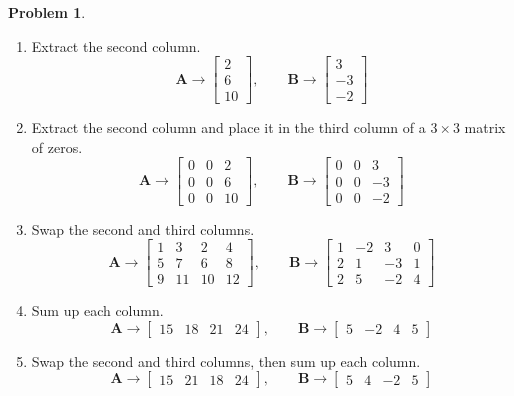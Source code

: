 \documentclass[12pt]{article}
\theoremstyle{definition}
\newtheorem{problem}{Problem}
\renewcommand{\vec}{\mathbf}
\begin{document}
\begin{problem}
    \begin{enumerate}
        \item Extract the second column.
            \[
                \vec{A} \to \begin{bmatrix} 2 \\ 6 \\ 10 \end{bmatrix}
                    ,\qquad
                    \vec{B} \to \begin{bmatrix} 3 \\ -3 \\ -2 \end{bmatrix}
            \]
        \item Extract the second column and place it in the third column of a $3\times 3$ matrix of zeros.
            \[
                    \vec{A} \to \begin{bmatrix} 0&0&2 \\ 0&0&6 \\ 0&0&10 \end{bmatrix}
                    ,\qquad
                    \vec{B} \to \begin{bmatrix} 0&0&3 \\ 0&0&-3 \\ 0&0&-2 \end{bmatrix}
            \]
        \item Swap the second and third columns.
    \[
        \vec{A} \to 
        \begin{bmatrix}
            1 & 3 & 2 & 4 \\
            5 & 7 & 6 & 8 \\
            9 & 11 & 10 & 12
        \end{bmatrix}
        ,\qquad 
        \vec{B} \to
        \begin{bmatrix}
            1 & -2 & 3& 0 \\
            2 & 1 & -3 & 1 \\
            2 & 5 & -2 & 4
        \end{bmatrix}
    \]
    \item Sum up each column.
    \[
        \vec{A} \to  
        \begin{bmatrix}
            15 & 18 & 21 & 24 
        \end{bmatrix}
        ,\qquad 
        \vec{B} \to 
        \begin{bmatrix}
            5 & -2 & 4 & 5
        \end{bmatrix}
    \]
    \item Swap the second and third columns, then sum up each column.
    \[
        \vec{A} \to  
        \begin{bmatrix}
            15 & 21 & 18 & 24 
        \end{bmatrix}
        ,\qquad 
        \vec{B} \to 
        \begin{bmatrix}
            5 & 4 & -2 & 5
        \end{bmatrix}
    \]


\end{enumerate}
\end{problem}
\end{document}
